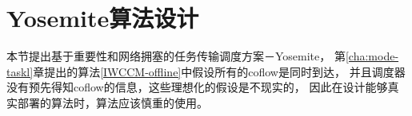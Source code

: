 %
%
%



\section{Yosemite算法设计}
本节提出基于重要性和网络拥塞的任务传输调度方案－Yosemite，
第\ref{cha:mode-taskl}章提出的算法\ref{IWCCM-offline}中假设所有的coflow是同时到达，
并且调度器没有预先得知coflow的信息，这些理想化的假设是不现实的，
 因此在设计能够真实部署的算法时，算法应该慎重的使用。

 

